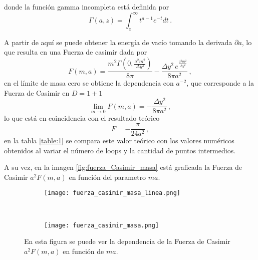 donde la función gamma incompleta está definida por
\begin{equation*}
\Gamma (a, z) = \int _{z} ^{\infty} t^{a-1} e ^{-t} dt
\, .
\end{equation*}

A partir de aquí se puede obtener la energía de vacío tomando la derivada  $\partial a$, lo que resulta en una Fuerza de casimir dada por
\begin{equation}
F (m,a) = 
\frac{m^2 \Gamma \left( 0 , \frac{a ^2 m^2}{\Delta y^2} \right)}{8 \pi}
- \frac{\Delta y^2 \, e ^ {\frac{a ^2 m^2}{\Delta y^2}}}{8 \pi a^2 } 
\, ,
\end{equation}
en el límite de masa cero se obtiene la dependencia con $a^{-2}$, que corresponde a la Fuerza de Casimir en $D = 1+1$
\begin{equation}
\lim _{m \rightarrow 0} F(m,a) = - \frac{\Delta y^2}{8 \pi a^2}
\, ,
\end{equation}
lo que está en coincidencia con el resultado teórico 
\begin{equation}
F = - \frac{\pi}{24 a^2}
\, ,
\end{equation}
en la tabla \ref{table:1} se compara este valor teórico con los valores numéricos obtenidos al variar el número de loops y la cantidad de puntos intermedios.



\begin{comment}
donde la solución exacta está dada por
\begin{equation}
F = 
-\frac{1}{4 \pi a^2} \int _{2 m a} ^{\infty} dy \frac{\sqrt{y^2 - 4 m^2 a^2}}{e^y -1} 
+ \frac{m^2}{ \pi } \int _{2 m a} ^{\infty} \frac{dy}{(e^y-1) (y^2 - 4 a^2 m^2)}
\, ,
\end{equation}

\end{comment}

A su vez, en la imagen \eqref{fig:fuerza_Casimir_masa} está graficada la Fuerza de Casimir $a^2 F(m,a)$ en función del parametro $m a$.

\begin{figure*}[t!]
    \centering
    \begin{subfigure}[t]{0.5\textwidth}
        \centering
        \texttt{[image: fuerza\_casimir\_masa\_linea.png]}
        \caption{}
        \label{fig.izquierda_21}
    \end{subfigure}%
    ~
    \begin{subfigure}[t]{0.5\textwidth}
        \centering
        \texttt{[image: fuerza\_casimir\_masa.png]}
        \caption{}
        \label{fig.derecha.derecha1}
    \end{subfigure}
    \caption{En esta figura se puede ver la dependencia de la Fuerza de Casimir $a^2 F(m,a)$ en función de $m a$.}
\label{fig:fuerza_Casimir_masa}
\end{figure*}



